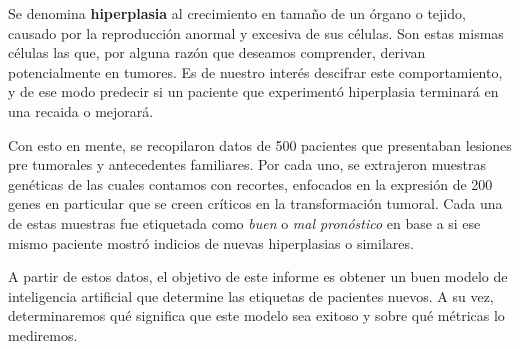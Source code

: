 Se denomina \textbf{hiperplasia} al crecimiento en tamaño de un órgano o tejido, causado por la reproducción anormal y excesiva de sus células. Son estas mismas células las que, por alguna razón que deseamos comprender, derivan potencialmente en tumores. Es de nuestro interés descifrar este comportamiento, y de ese modo predecir si un paciente que experimentó hiperplasia terminará en una recaida o mejorará. 

Con esto en mente, se recopilaron datos de 500 pacientes que presentaban lesiones pre tumorales y antecedentes familiares. Por cada uno, se extrajeron muestras genéticas de las cuales contamos con recortes, enfocados en la expresión de 200 genes en particular que se creen críticos en la transformación tumoral. Cada una de estas muestras fue etiquetada como \textit{buen} o \textit{mal pronóstico} en base a si ese mismo paciente mostró indicios de nuevas hiperplasias o similares.

A partir de estos datos, el objetivo de este informe es obtener un buen modelo de inteligencia artificial que determine las etiquetas de pacientes nuevos. A su vez, determinaremos qué significa que este modelo sea exitoso y sobre qué métricas lo mediremos.